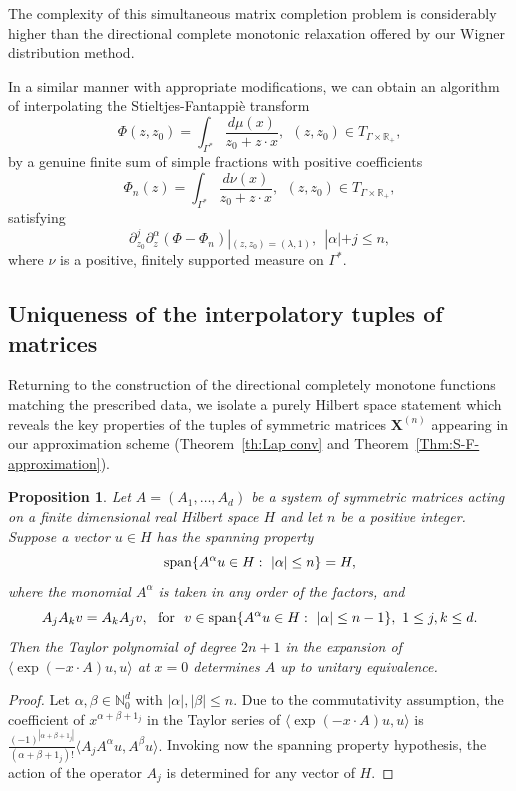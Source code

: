 \documentclass[11pt,reqno]{amsart}
\theoremstyle{plain}
\newtheorem{proposition}[theorem]{Proposition}
\theoremstyle{definition}
\numberwithin{equation}{section}
\begin{document}
	The complexity of this simultaneous matrix completion problem is considerably higher than the directional complete monotonic relaxation offered by our Wigner distribution method.
	
In a similar manner with appropriate modifications, we can obtain an algorithm of interpolating the Stieltjes-Fantappi\`e transform 
	$$ \Phi(z, z_0) = \int_{\Gamma^*} \frac{d\mu(x)}{z_0 + z\cdot x}, \ \ (z, z_0) \in T_{\Gamma \times \mathbb{R}_+},$$
	by a genuine finite sum of simple fractions with positive coefficients
	$$ \Phi_n(z) = \int_{\Gamma^*} \frac{d\nu(x)}{z_0 + z\cdot x}, \ \ (z, z_0) \in T_{\Gamma \times \mathbb{R}_+},$$
	satisfying
	$$ \partial_{z_0}^j \partial_z^\alpha (\Phi - \Phi_n)|_{(z, z_0)=(\lambda, 1)} , \ \ |\alpha|+j \leq n,$$ where $\nu$ is a positive, finitely supported measure on $\Gamma^*$.
		
\subsection{Uniqueness of the interpolatory tuples of matrices} Returning to the construction of the directional completely monotone functions matching the prescribed data, we isolate a purely Hilbert space statement which reveals the key properties of the tuples of symmetric matrices $\boldsymbol{X}^{(n)}$ appearing in 	our approximation scheme (Theorem~\ref{th:Lap conv} and Theorem~\ref{Thm:S-F-approximation}).

\begin{proposition}\label{unique-tuple} Let $A = (A_1, \ldots, A_d)$ be a system of symmetric matrices acting on a finite dimensional real Hilbert space $H$ and let $n$ be a positive integer. Suppose a vector $u \in H$ has the spanning property
$$ {\rm span} \{ A^\alpha u \in H : \ |\alpha| \leq n \} = H,$$
where the monomial $A^\alpha$ is taken in any order of the factors, and
$$ A_j A_k v = A_k A_j v, \ \text{ for } \ v \in  {\rm span} \{ A^\alpha u \in H: \ |\alpha| \leq n-1 \}, \ 1 \leq j, k \leq d.$$
Then the Taylor polynomial of degree $2n+1$ in the expansion of \\
$ \langle \exp ( -x \cdot A)u, u \rangle $ at $x=0$ determines $A$ up to unitary equivalence.
\end{proposition} 

\begin{proof} Let $\alpha, \beta \in \mathbb{N}_0^d$ with $|\alpha|, |\beta| \leq n.$ Due to the commutativity assumption, the coefficient of $x^{\alpha+\beta + 1_j}$ in the Taylor series of
$ \langle \exp ( -x \cdot A)u, u \rangle $ is 
$\frac{(-1)^{|\alpha + \beta + 1_j|}}{(\alpha + \beta + 1_j)!} \langle A_j A^\alpha u, A^\beta u \rangle.$ Invoking now the spanning property hypothesis, the action of the operator $A_j$ is determined for any vector of $H$.
\end{proof} 
\end{document}
